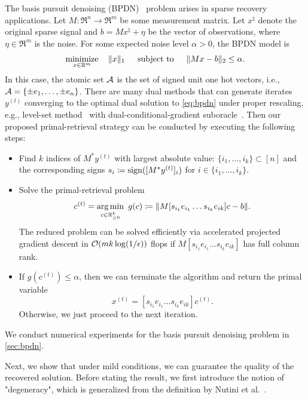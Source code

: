 \begin{example} \label{ex:bpdn}
    The basis pursuit denoising (BPDN)~\cite{cds98} problem arises in sparse recovery applications. Let $M:\Re^n \to \Re^m$ be some
    measurement matrix. Let $x^\natural$ denote the original sparse signal and
    $b = Mx^\natural + \eta$ be the vector of observations, where $\eta \in \Re^m$ is the noise. For some expected noise level $\alpha > 0$, the BPDN model is 
    \begin{equation} \label{eq:bpdn}
        \displaystyle\mathop{\hbox{\rm minimize}}_{x\in\mathbb{R}^m}\enspace\enspace \|x\|_1  \enspace\hbox{\quad subject to\quad}\enspace \|Mx - b\|_2 \leq \alpha.
    \end{equation}
    In this case, the atomic set $\mathcal{A}$ is the set of signed unit one hot vectors, i.e., $\mathcal{A} = \{\pm e_1, \dots, \pm e_n\}$. There are many dual methods that can generate iterates $y^{(t)}$ converging to the optimal dual solution to \eqref{eq:bpdn} under proper rescaling, e.g., level-set method~\cite{aravkin2016levelset} with dual-conditional-gradient suboracle~\cite{fan2019alignment}. Then our proposed primal-retrieval strategy can be conducted by executing the following steps:
    \begin{itemize}
        \item Find $k$ indices of $M^*y^{(t)}$ with largest absolute value: $\{i_1, \dots, i_k\} \subset [n]$ and the corresponding signs $s_i \coloneqq \operatorname{sign}([M^*y^{(t)}]_i)$ for $i \in \{i_1, \dots, i_k\}$. 
        \item Solve the primal-retrieval problem
        \begin{equation} \label{eq:bpdn_pr}
            c^{(t)} = \underset{c \in \mathbb{R}_{\geq 0}^k}{\textrm{arg}\,{\min}}\enskip g(c) \coloneqq \|M[s_{i_1}e_{i_1} \dots s_{i_k}e_{ik}]c - b\|.
        \end{equation}
        The reduced problem can be solved efficiently via accelerated projected gradient descent in $\mathcal{O}( m k \log(1/\epsilon) )$ flops if $M[s_{i_1}e_{i_1} \dots s_{i_k}e_{ik}]$ has full column rank.
        \item If $g(c^{(t)}) \leq \alpha$, then we can terminate the algorithm and return the primal variable 
        \[x^{(t)} = [s_{i_1}e_{i_1} \dots s_{i_k}e_{ik}]c^{(t)}.\]
        Otherwise, we just proceed to the next iteration. 
    \end{itemize}
    We conduct numerical experiments for the basis pursuit denoising problem in \autoref{sec:bpdn}. 
\end{example}

Next, we show that under mild conditions, we can guarantee the quality of the recovered solution. Before stating the result, we first introduce the notion of "degeneracy", which is generalized from the definition by Nutini et al.~\cite{nutini2019active}. 

